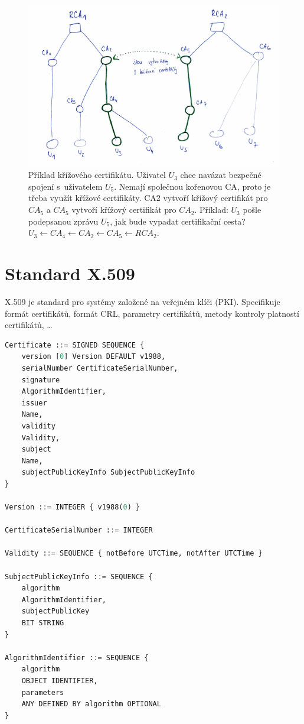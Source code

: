 \begin{figure}[H]
    \centering
    \includegraphics[width=1\linewidth]{krizovy_certifikat.pdf}
    \caption{Příklad křížového certifikátu. Uživatel $U_3$ chce navázat bezpečné spojení s~uživatelem $U_5$. Nemají společnou kořenovou CA, proto je třeba využít křížové certifikáty. CA2 vytvoří křížový certifikát pro $CA_5$ a $CA_5$ vytvoří křížový certifikát pro $CA_2$. Příklad: $U_3$ pošle podepsanou zprávu $U_5$, jak bude vypadat certifikační cesta? $U_3 \leftarrow CA_4 \leftarrow CA_2 \leftarrow CA_5 \leftarrow RCA_2$.}
\end{figure}


\section{Standard X.509}

X.509 je standard pro systémy založené na veřejném klíči (PKI). Specifikuje formát certifikátů, formát CRL, parametry certifikátů, metody kontroly platností certifikátů, \dots

\bigskip\noindent\begin{minipage}{\linewidth}
\begin{lstlisting}[language=Python, caption={Příklad definice certifikátu ve formátu X.509.}]
Certificate ::= SIGNED SEQUENCE {
    version [0] Version DEFAULT v1988,
    serialNumber CertificateSerialNumber,
    signature
    AlgorithmIdentifier,
    issuer
    Name,
    validity
    Validity,
    subject
    Name,
    subjectPublicKeyInfo SubjectPublicKeyInfo
}

Version ::= INTEGER { v1988(0) }

CertificateSerialNumber ::= INTEGER

Validity ::= SEQUENCE { notBefore UTCTime, notAfter UTCTime }

SubjectPublicKeyInfo ::= SEQUENCE {
    algorithm
    AlgorithmIdentifier,
    subjectPublicKey
    BIT STRING
}

AlgorithmIdentifier ::= SEQUENCE {
    algorithm
    OBJECT IDENTIFIER,
    parameters
    ANY DEFINED BY algorithm OPTIONAL
}
\end{lstlisting}
\end{minipage}

